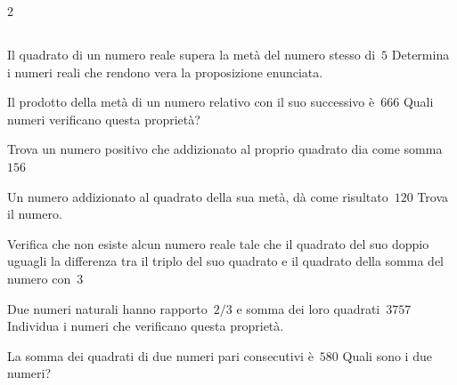 \begin{htmulticols}{2}


\subsection*{}

\begin{esercizio}[*]
\label{ese:3.112}
Il quadrato di un numero reale supera la metà del numero stesso di~\(5\)
Determina i numeri reali che rendono vera la proposizione enunciata.
\end{esercizio}

\begin{esercizio}[*]
\label{ese:3.113}
Il prodotto della metà di un numero relativo con il suo successivo è~\(666\)
Quali numeri verificano questa proprietà?
\end{esercizio}

\begin{esercizio}
\label{ese:3.114}
Trova un numero positivo che addizionato al proprio quadrato dia come 
somma~\(156\)
\end{esercizio}

\begin{esercizio}
\label{ese:3.115}
Un numero addizionato al quadrato della sua metà, dà come risultato~\(120\)
Trova il numero.
\end{esercizio}

\begin{esercizio}
\label{ese:3.116}
Verifica che non esiste alcun numero reale tale che il quadrato del suo
doppio uguagli la differenza tra il triplo del suo quadrato e il quadrato
della somma del numero con~\(3\)
\end{esercizio}

\begin{esercizio}[*]
\label{ese:3.117}
Due numeri naturali hanno rapporto~\(2/3\) e somma dei loro 
quadrati~\(3757\)
Individua i numeri che verificano questa proprietà.
\end{esercizio}

\begin{esercizio}[*]
\label{ese:3.118}
La somma dei quadrati di due numeri pari consecutivi è~\(580\) Quali sono i
due numeri?
\end{esercizio}


\end{htmulticols}
